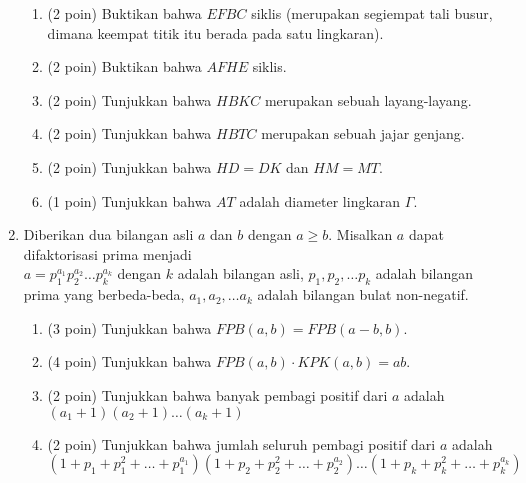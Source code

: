 \documentclass{article}
\begin{document}
\begin{enumerate}[resume]
\begin{enumerate}
		\item (2 poin) Buktikan bahwa $EFBC$ siklis (merupakan segiempat tali busur, dimana keempat titik itu berada pada satu lingkaran).
		
		\item (2 poin) Buktikan bahwa $AFHE$ siklis.
		
		\item (2 poin) Tunjukkan bahwa $HBKC$ merupakan sebuah layang-layang.
		
		\item (2 poin) Tunjukkan bahwa $HBTC$ merupakan sebuah jajar genjang.
		
		\item (2 poin) Tunjukkan bahwa $HD=DK$ dan $HM=MT$.
		
		\item (1 poin) Tunjukkan bahwa $AT$ adalah diameter lingkaran $\Gamma$.
	\end{enumerate}
	
	\item Diberikan dua bilangan asli $a$ dan $b$ dengan $a \ge b$. Misalkan $a$ dapat difaktorisasi prima menjadi\\ $a = p_1^{a_1}p_2^{a_2}\dots p_k^{a_k}$ dengan $k$ adalah bilangan asli, $p_1,p_2,\dots p_k$ adalah bilangan prima yang berbeda-beda, $a_1,a_2,\dots a_k$ adalah bilangan bulat non-negatif.
	\begin{enumerate}
		\item (3 poin) Tunjukkan bahwa $FPB(a,b) = FPB(a-b,b)$.
		\item (4 poin) Tunjukkan bahwa $FPB(a,b) \cdot KPK(a,b) = ab$.
		\item (2 poin) Tunjukkan bahwa banyak pembagi positif dari $a$ adalah $(a_1+1)(a_2+1)\dots(a_k+1)$
		\item (2 poin) Tunjukkan bahwa jumlah seluruh pembagi positif dari $a$ adalah $(1+p_1+p_1^2+\dots+p_1^{a_1})(1+p_2+p_2^2+\dots+p_2^{a_2})\dots (1+p_k+p_k^2+\dots+p_k^{a_k})$
	\end{enumerate}
	
\end{enumerate}
\end{document}
